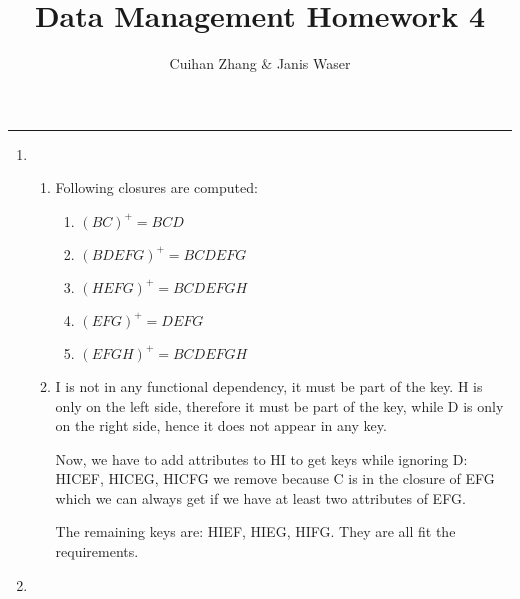 \documentclass[12pt]{extarticle}
\title{Data Management Homework 4}
\author{Cuihan Zhang \& Janis Waser}
\begin{document}
\maketitle \vspace{-10mm}
\rule{\linewidth}{0.4pt}


\begin{flushleft}
\begin{enumerate}

\item

\begin{enumerate}
\item Following closures are computed:


\begin{enumerate}

\item  $(BC)^+=BCD$
\item $(BDEFG)^+=BCDEFG$
\item $(HEFG)^+=BCDEFGH$
\item $(EFG)^+=DEFG$
\item $(EFGH)^+=BCDEFGH$
\end{enumerate}
\item I is not in any functional dependency, it must be part of the key. H is only on the left side, therefore it must be part of the key, while D is only on the right side, hence it does not appear in any key. 

Now, we have to add attributes to HI to get keys while ignoring D:
HICEF, HICEG, HICFG we remove because C is in the closure of EFG which we can always get if we have at least two attributes of EFG. 

The remaining keys are: HIEF, HIEG, HIFG. They are all fit the requirements.
\end{enumerate}
\item 
\end{enumerate}
\end{flushleft}
\end{document}
